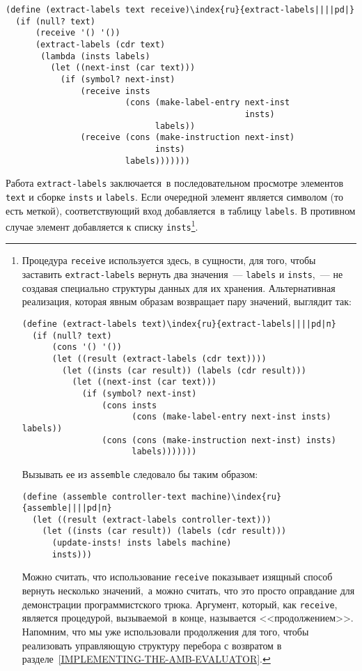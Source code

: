 \begin{Verbatim}[fontsize=\small]
(define (extract-labels text receive)\index{ru}{extract-labels||||pd|}
  (if (null? text)
      (receive '() '())
      (extract-labels (cdr text)
       (lambda (insts labels)
         (let ((next-inst (car text)))
           (if (symbol? next-inst)
               (receive insts
                        (cons (make-label-entry next-inst
                                                insts)
                              labels))
               (receive (cons (make-instruction next-inst)
                              insts)
                        labels)))))))
\end{Verbatim}
Работа {\tt extract-labels} заключается~в последовательном
просмотре элементов {\tt text} и сборке {\tt insts} и
{\tt labels}.  Если очередной элемент является символом (то
есть меткой), соответствующий вход добавляется~в таблицу
{\tt labels}.  В противном случае элемент добавляется к списку
{\tt insts}\footnote{Процедура {\tt receive} используется здесь, в
сущности,  для того, чтобы заставить {\tt extract-labels} вернуть
два значения~--- {\tt labels} и {\tt insts},~--- не
создавая специально структуры данных для их хранения.  Альтернативная
реализация, которая явным образам возвращает пару значений, выглядит
так:

\begin{Verbatim}
(define (extract-labels text)\index{ru}{extract-labels||||pd|п}
  (if (null? text)
      (cons '() '())
      (let ((result (extract-labels (cdr text))))
        (let ((insts (car result)) (labels (cdr result)))
          (let ((next-inst (car text)))
            (if (symbol? next-inst)
                (cons insts
                      (cons (make-label-entry next-inst insts) labels))
                (cons (cons (make-instruction next-inst) insts)
                      labels)))))))
\end{Verbatim}
Вызывать ее из {\tt assemble} следовало бы таким образом:

\begin{Verbatim}
(define (assemble controller-text machine)\index{ru}{assemble||||pd|п}
  (let ((result (extract-labels controller-text)))
    (let ((insts (car result)) (labels (cdr result)))
      (update-insts! insts labels machine)
      insts)))
\end{Verbatim}
Можно считать, что использование {\tt receive}
показывает изящный
способ вернуть несколько значений,~а можно
считать, что это просто оправдание для демонстрации программистского
трюка.  Аргумент, который, как {\tt receive}, является
процедурой, вызываемой~в конце, называется
<<продолжением>>.
Напомним, что мы уже использовали
продолжения для 
того, чтобы реализовать управляющую структуру перебора с возвратом в
разделе~\ref{IMPLEMENTING-THE-AMB-EVALUATOR}.
}. %

